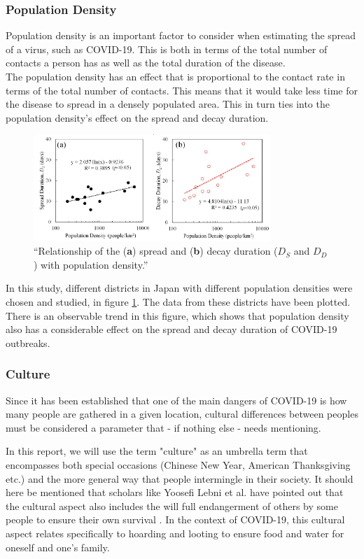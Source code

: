 \subsubsection{Population Density}
Population density is an important factor to consider when estimating the spread of a virus, such as COVID-19. This is both in terms of the total number of contacts a person has as well as the total duration of the disease. \\
The population density has an effect that is proportional to the contact rate \citep{rocklov_high_2020} in terms of the total number of contacts. This means that it would take less time for the disease to spread in a densely populated area. This in turn ties into the population density's effect on the spread and decay duration.
\begin{figure}[H]
    \centering
    \includegraphics[width=0.8\textwidth]{0_billeder/Spread-Decay.png}
    \caption{``Relationship of the (\textbf{a}) spread and (\textbf{b}) decay duration ($D_S$ and $D_D$) with population density.'' \citep{rashed_influence_2020}}
    \label{fig:Spread-Decay}
\end{figure}
In this study, different districts in Japan with different population densities were chosen and studied, in figure \ref{fig:Spread-Decay}. The data from these districts have been plotted. There is an observable trend in this figure, which shows that population density also has a considerable effect on the spread and decay duration of COVID-19 outbreaks. 

\subsubsection{Culture}
Since it has been established that one of the main dangers of COVID-19 is how many people are gathered in a given location, cultural differences between peoples must be considered a parameter that - if nothing else - needs mentioning.

In this report, we will use the term "culture" as an umbrella term that encompasses both special occasions (Chinese New Year, American Thanksgiving etc.) and the more general way that people intermingle in their society. It should here be mentioned that scholars like Yoosefi Lebni et al. have pointed out that the cultural aspect also includes the will full endangerment of others by some people to ensure their own survival \citep{yoosefi_lebni_how_2020}. In the context of COVID-19, this cultural aspect relates specifically to hoarding and looting to ensure food and water for oneself and one's family.

